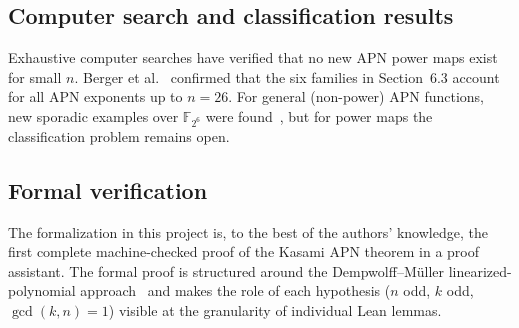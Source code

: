 \documentclass[11pt]{article}
\begin{document}
\subsection{Computer search and classification results}
Exhaustive computer searches have verified that no new APN power maps exist for small $n$.
Berger et al.~\cite{Berger2006} confirmed that the six families in Section~6.3 account for
all APN exponents up to $n=26$. For general (non-power) APN functions, new sporadic
examples over $\mathbb{F}_{2^6}$ were found~\cite{Edel2006}, but for power maps the
classification problem remains open.

\subsection{Formal verification}
The formalization in this project is, to the best of the authors' knowledge, the first
complete machine-checked proof of the Kasami APN theorem in a proof assistant. The formal
proof is structured around the Dempwolff--M\"{u}ller linearized-polynomial
approach~\cite{DempwolffMueller2021} and makes the role of each hypothesis ($n$ odd,
$k$ odd, $\gcd(k,n)=1$) visible at the granularity of individual Lean lemmas.
\end{document}
